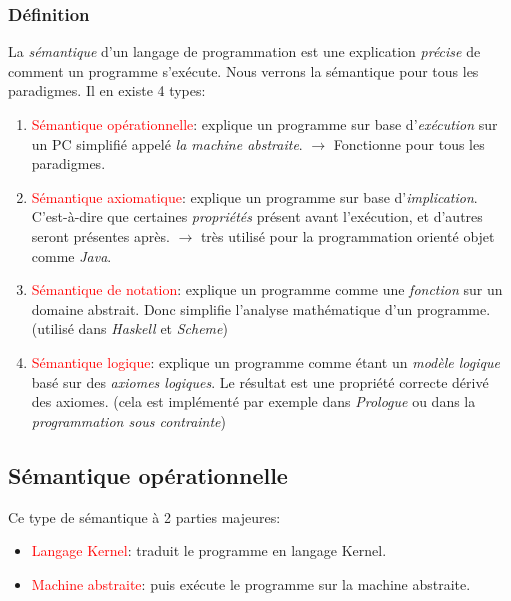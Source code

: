 \documentclass{report}
\begin{document}
\subsubsection{Définition}
La \textit{sémantique} d'un langage de programmation est une explication \textit{précise} de comment un programme s'exécute. Nous verrons la sémantique pour tous les paradigmes. Il en existe 4 types:
\begin{enumerate}
\item \textcolor{red}{Sémantique opérationnelle}: explique un programme sur base d'\textit{exécution} sur un PC simplifié appelé \textit{la machine abstraite}. $\rightarrow$ Fonctionne pour tous les paradigmes.
\item \textcolor{red}{Sémantique axiomatique}: explique un programme sur base d'\textit{implication}. C'est-à-dire que certaines \textit{propriétés} présent avant l'exécution, et d'autres seront présentes après. $\rightarrow$ très utilisé pour la programmation orienté objet comme \textit{Java}.
\item \textcolor{red}{Sémantique de notation}: explique un programme comme une \textit{fonction} sur un domaine abstrait. Donc simplifie l'analyse mathématique d'un programme. (utilisé dans \textit{Haskell} et \textit{Scheme})
\item \textcolor{red}{Sémantique logique}: explique un programme comme étant un \textit{modèle logique} basé sur des \textit{axiomes logiques}. Le résultat est une propriété correcte dérivé des axiomes. (cela est implémenté par exemple dans \textit{Prologue} ou dans la \textit{programmation sous contrainte})
\end{enumerate}

\subsection{Sémantique opérationnelle}
Ce type de sémantique à 2 parties majeures:
\begin{itemize}
\item \textcolor{red}{Langage Kernel}: traduit le programme en langage Kernel.
\item \textcolor{red}{Machine abstraite}: puis exécute le programme sur la machine abstraite.
\end{itemize}
\end{document}
